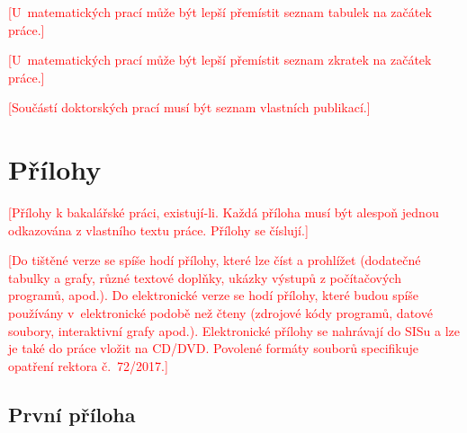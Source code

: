 \documentclass[12pt,a4paper]{report}
\let\openright=\clearpage
\def\XXX#1{\par\smallskip\noindent \textcolor{red}{[#1]}}
\begin{document}



\tableofcontents











\listoffigures

\listoftables
\XXX{U~matematických prací může být lepší přemístit seznam tabulek na začátek práce.}

\XXX{U~matematických prací může být lepší přemístit seznam zkratek na začátek práce.}

\XXX{Součástí doktorských prací musí být seznam vlastních publikací.}

\appendix
\chapter{Přílohy}
\XXX{Přílohy k bakalářské práci, existují-li. Každá příloha musí být alespoň jednou odkazována z vlastního textu práce. Přílohy se číslují.}
\XXX{Do tištěné verze se spíše hodí přílohy, které lze číst a prohlížet (dodatečné tabulky a grafy, různé textové doplňky, ukázky výstupů z počítačových programů, apod.). Do elektronické verze se hodí přílohy, které budou spíše používány v~elektronické podobě než čteny (zdrojové kódy programů, datové soubory, interaktivní grafy apod.). Elektronické přílohy se nahrávají do SISu a lze je také do práce vložit na CD/DVD. Povolené formáty souborů specifikuje opatření rektora č.~72/2017.}

\section{První příloha}

\openright
\end{document}
